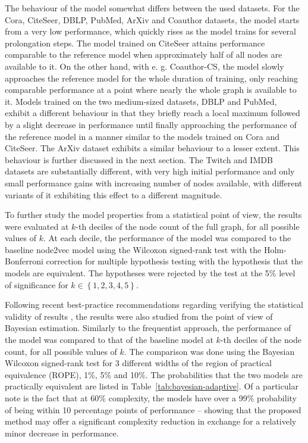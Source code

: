 The behaviour of the model somewhat differs between the used datasets. For the Cora, CiteSeer, DBLP, PubMed, ArXiv and Coauthor datasets, the model starts from a very low performance, which quickly rises as the model trains for several prolongation steps. The model trained on CiteSeer attains performance comparable to the reference model when approximately half of all nodes are available to it. On the other hand, with e. g. Coauthor-CS, the model slowly approaches the reference model for the whole duration of training, only reaching comparable performance at a point where nearly the whole graph is available to it. Models trained on the two medium-sized datasets, DBLP and PubMed, exhibit a different behaviour in that they briefly reach a local maximum followed by a slight decrease in performance until finally approaching the performance of the reference model in a manner similar to the models trained on Cora and CiteSeer. The ArXiv dataset exhibits a similar behaviour to a lesser extent. This behaviour is further discussed in the next section. The Twitch and IMDB datasets are substantially different, with very high initial performance and only small performance gains with increasing number of nodes available, with different variants of it exhibiting this effect to a different magnitude.

To further study the model properties from a statistical point of view, the results were evaluated at \( k \)-th deciles of the node count of the full graph, for all possible values of \( k \). At each decile, the performance of the model was compared to the baseline node2vec model using the Wilcoxon signed-rank test with the Holm-Bonferroni correction for multiple hypothesis testing with the hypothesis that the models are equivalent. The hypotheses were rejected by the test at the 5\% level of significance for \( k \in \left\{ 1, 2, 3, 4, 5 \right\} \).

Following recent best-practice recommendations regarding verifying the statistical validity of results \cite{benavoli_time_2017}, the results were also studied from the point of view of Bayesian estimation. Similarly to the frequentist approach, the performance of the model was compared to that of the baseline model at \( k \)-th deciles of the node count, for all possible values of \( k \). The comparison was done using the Bayesian Wilcoxon signed-rank test \cite{benavoli_bayesian_2014} for 3 different widths of the region of practical equivalence (ROPE), 1\%, 5\% and 10\%. The probabilities that the two models are practically equivalent are listed in Table~\ref{tab:bayesian-adaptive}. Of a particular note is the fact that at 60\% complexity, the models have over a 99\% probability of being within 10 percentage points of performance -- showing that the proposed method may offer a significant complexity reduction in exchange for a relatively minor decrease in performance.

